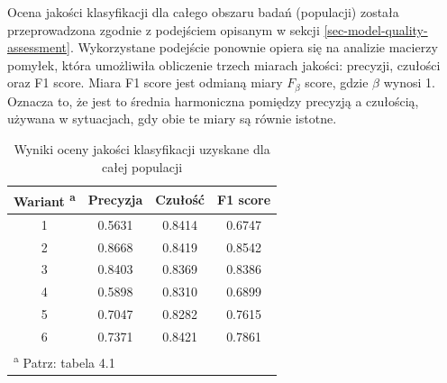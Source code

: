 \documentclass{amuthesis}
\begin{document}
Ocena jakości klasyfikacji dla całego obszaru badań (populacji) została
przeprowadzona zgodnie z podejściem opisanym w sekcji
\ref{sec-model-quality-assessment}. Wykorzystane podejście ponownie
opiera się na analizie macierzy pomyłek, która umożliwiła obliczenie
trzech miarach jakości: precyzji, czułości oraz F1 score. Miara F1 score
jest odmianą miary \(F_{\beta}\) score, gdzie \({\beta}\) wynosi 1.
Oznacza to, że jest to średnia harmoniczna pomiędzy precyzją a
czułością, używana w sytuacjach, gdy obie te miary są równie istotne.

\hypertarget{tbl-tabela-population-quality-assessment}{}
\begin{table}
\caption{\label{tbl-tabela-population-quality-assessment}Wyniki oceny jakości klasyfikacji uzyskane dla całej populacji }\tabularnewline

\centering
\begin{tabular}{cccc}
\toprule
Wariant \textsuperscript{a} & Precyzja & Czułość & F1 score\\
\midrule
1 & 0.5631 & 0.8414 & 0.6747\\
2 & 0.8668 & 0.8419 & 0.8542\\
3 & 0.8403 & 0.8369 & 0.8386\\
4 & 0.5898 & 0.8310 & 0.6899\\
5 & 0.7047 & 0.8282 & 0.7615\\
6 & 0.7371 & 0.8421 & 0.7861\\
\bottomrule
\multicolumn{4}{l}{\textsuperscript{a} Patrz: tabela 4.1}\\
\end{tabular}
\end{table}
\end{document}
